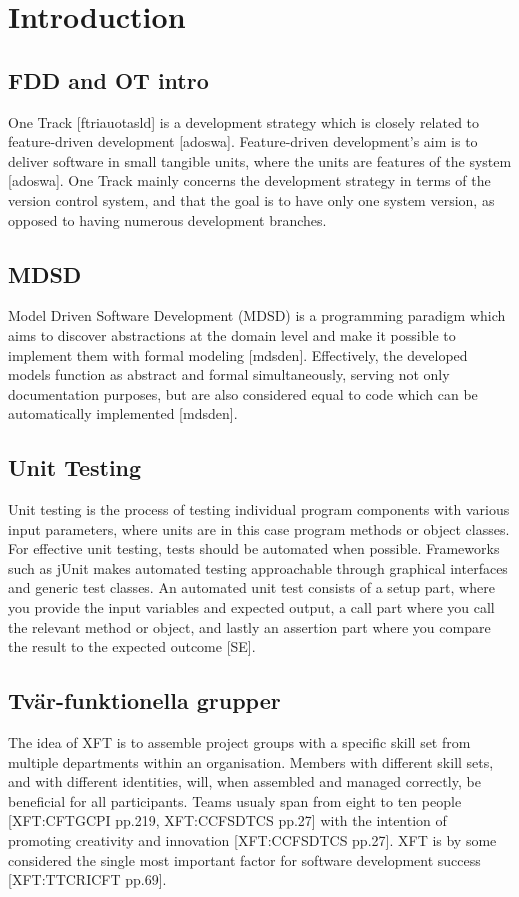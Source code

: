 \documentclass[fina_report_innit.tex]{subfiles}
\begin{document}
\section{Introduction}

\subsection*{FDD and OT intro}
One Track [ftriauotasld] is a development strategy which is closely related to feature-driven development [adoswa]. Feature-driven development's aim is to deliver software in small tangible units, where the units are features of the system [adoswa]. One Track mainly concerns the development strategy in terms of the version control system, and that the goal is to have only one system version, as opposed to having numerous development branches. 

\subsection*{MDSD}
Model Driven Software Development (MDSD) is a programming paradigm which aims to discover abstractions at the domain level and make it possible to implement them with formal modeling [mdsden]. Effectively, the developed models function as abstract and formal simultaneously, serving not only documentation purposes, but are also considered equal to code which can be automatically implemented [mdsden].

\subsection*{Unit Testing}
Unit testing is the process of testing individual program components with various input parameters, where units are in this case program methods or object classes.
For effective unit testing, tests should be automated when possible.  Frameworks such as jUnit makes automated testing approachable through graphical interfaces and generic test classes. An automated unit test consists of a setup part, where you provide the input variables and expected output, a call part where you call the relevant method or object, and lastly an assertion part where you compare the result to the expected outcome [SE]. 

\subsection*{Tvär-funktionella grupper}
The idea of XFT is to assemble project groups with a specific skill set from multiple departments within an organisation. Members with different skill sets, and with different identities, will, when assembled and managed correctly, be beneficial for all participants. Teams usualy span from eight to ten people [XFT:CFTGCPI pp.219, XFT:CCFSDTCS pp.27] with the intention of promoting creativity and innovation [XFT:CCFSDTCS pp.27]. XFT is by some considered the single most important factor for software development success [XFT:TTCRICFT pp.69].
\end{document}
